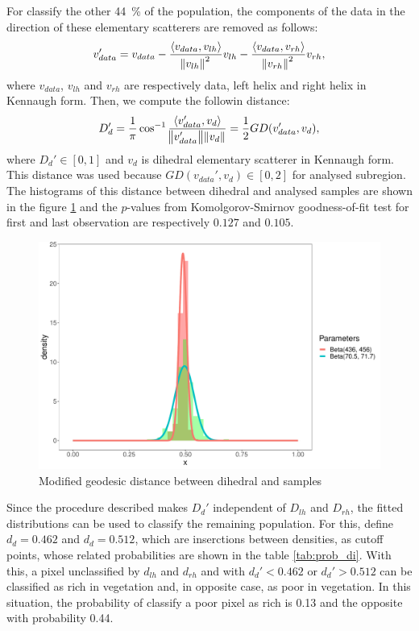 \documentclass[12pt]{article}
\begin{document}
For classify the other \SI{44}{\percent} of the population, the components of the data in the direction of these elementary scatterers are removed as follows:
\begin{equation}
  v_{data}' =  v_{data} - \frac{\langle v_{data}, v_{lh} \rangle}{\norm{v_{lh}}^2} v_{lh} - \frac{\langle v_{data}, v_{rh} \rangle}{\norm{v_{rh}}^2} v_{rh},
\end{equation}
where $v_{data}$, $v_{lh}$ and $v_{rh}$ are respectively data, left helix and right helix in Kennaugh form. Then, we compute the followin distance:
\begin{equation}
  D_{d}' = \frac{1}{\pi} \cos^{-1}\frac{\langle v_{data}', v_d \rangle}{\norm{v_{data}'}\norm{v_d}} = \frac{1}{2}GD(v_{data}', v_d),
\end{equation}
where $D_d' \in [0, 1]$ and $v_d$ is dihedral elementary scatterer in Kennaugh form. This distance was used because $GD(v_{data}', v_d) \in [0, 2]$ for analysed subregion. The histograms of this distance between dihedral and analysed samples are shown in the figure \ref{fig:hist_di} and the $p$-values from Komolgorov-Smirnov goodness-of-fit test for first and last observation are respectively $0.127$ and $0.105$.
\begin{figure}[hbt]
  \centering
  \includegraphics[width = .5\linewidth]{Histograms/hist_mod_di}
  \caption{Modified geodesic distance between dihedral and samples}
  \label{fig:hist_di}
\end{figure}

Since the procedure described makes $D_d'$ independent of $D_{lh}$ and $D_{rh}$, the fitted distributions can be used to classify the remaining population. For this,
define $d_d = 0.462$ and $d_d = 0.512$, which are inserctions between densities, as cutoff points, whose related probabilities are shown in the table \ref{tab:prob_di}.
With this, a pixel unclassified by $d_{lh}$ and $d_{rh}$ and with $d_d' < 0.462$ or $d_d' > 0.512$ can be classified as rich in vegetation and, in opposite case, as poor in vegetation. In this situation, the probability of classify a poor pixel as rich is 0.13 and the opposite with probability 0.44.
\end{document}
